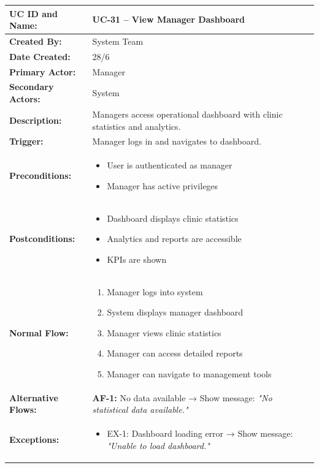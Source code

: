 \documentclass[12pt,a4paper]{article}
\begin{document}
\renewcommand{\arraystretch}{1.5}
\begin{longtable}{|p{4.5cm}|p{10.5cm}|}
\hline
\textbf{UC ID and Name:} & UC-31 – View Manager Dashboard \\
\hline
\textbf{Created By:} & System Team \\
\hline
\textbf{Date Created:} & 28/6 \\
\hline
\textbf{Primary Actor:} & Manager \\
\hline
\textbf{Secondary Actors:} & System \\
\hline
\textbf{Description:} & Managers access operational dashboard with clinic statistics and analytics. \\
\hline
\textbf{Trigger:} & Manager logs in and navigates to dashboard. \\
\hline
\textbf{Preconditions:} &
\begin{itemize}
  \item User is authenticated as manager
  \item Manager has active privileges
\end{itemize} \\
\hline
\textbf{Postconditions:} &
\begin{itemize}
  \item Dashboard displays clinic statistics
  \item Analytics and reports are accessible
  \item KPIs are shown
\end{itemize} \\
\hline
\textbf{Normal Flow:} &
\begin{enumerate}
  \item Manager logs into system
  \item System displays manager dashboard
  \item Manager views clinic statistics
  \item Manager can access detailed reports
  \item Manager can navigate to management tools
\end{enumerate} \\
\hline
\textbf{Alternative Flows:} &
\textbf{AF-1:} No data available → Show message: \textit{"No statistical data available."} \\
\hline
\textbf{Exceptions:} &
\begin{itemize}
  \item EX-1: Dashboard loading error → Show message: \textit{"Unable to load dashboard."}
\end{itemize} \\

\end{longtable}
\end{document}
